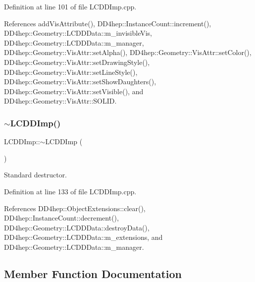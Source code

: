 Definition at line 101 of file L\+C\+D\+D\+Imp.\+cpp.



References add\+Vis\+Attribute(), D\+D4hep\+::\+Instance\+Count\+::increment(), D\+D4hep\+::\+Geometry\+::\+L\+C\+D\+D\+Data\+::m\+\_\+invisible\+Vis, D\+D4hep\+::\+Geometry\+::\+L\+C\+D\+D\+Data\+::m\+\_\+manager, D\+D4hep\+::\+Geometry\+::\+Vis\+Attr\+::set\+Alpha(), D\+D4hep\+::\+Geometry\+::\+Vis\+Attr\+::set\+Color(), D\+D4hep\+::\+Geometry\+::\+Vis\+Attr\+::set\+Drawing\+Style(), D\+D4hep\+::\+Geometry\+::\+Vis\+Attr\+::set\+Line\+Style(), D\+D4hep\+::\+Geometry\+::\+Vis\+Attr\+::set\+Show\+Daughters(), D\+D4hep\+::\+Geometry\+::\+Vis\+Attr\+::set\+Visible(), and D\+D4hep\+::\+Geometry\+::\+Vis\+Attr\+::\+S\+O\+L\+ID.

\hypertarget{class_d_d4hep_1_1_geometry_1_1_l_c_d_d_imp_a75a7b388970a2f18f79a8eddbc451411}{}\label{class_d_d4hep_1_1_geometry_1_1_l_c_d_d_imp_a75a7b388970a2f18f79a8eddbc451411} 
\subsubsection{\texorpdfstring{$\sim$\+L\+C\+D\+D\+Imp()}{~LCDDImp()}}
{\footnotesize\ttfamily L\+C\+D\+D\+Imp\+::$\sim$\+L\+C\+D\+D\+Imp (\begin{DoxyParamCaption}{ }\end{DoxyParamCaption})\hspace{0.3cm}{\ttfamily [virtual]}}



Standard destructor. 



Definition at line 133 of file L\+C\+D\+D\+Imp.\+cpp.



References D\+D4hep\+::\+Object\+Extensions\+::clear(), D\+D4hep\+::\+Instance\+Count\+::decrement(), D\+D4hep\+::\+Geometry\+::\+L\+C\+D\+D\+Data\+::destroy\+Data(), D\+D4hep\+::\+Geometry\+::\+L\+C\+D\+D\+Data\+::m\+\_\+extensions, and D\+D4hep\+::\+Geometry\+::\+L\+C\+D\+D\+Data\+::m\+\_\+manager.



\subsection{Member Function Documentation}
\hypertarget{class_d_d4hep_1_1_geometry_1_1_l_c_d_d_imp_aad80a2a7fab34d16dfdc2da299076dab}{}\label{class_d_d4hep_1_1_geometry_1_1_l_c_d_d_imp_aad80a2a7fab34d16dfdc2da299076dab} 
